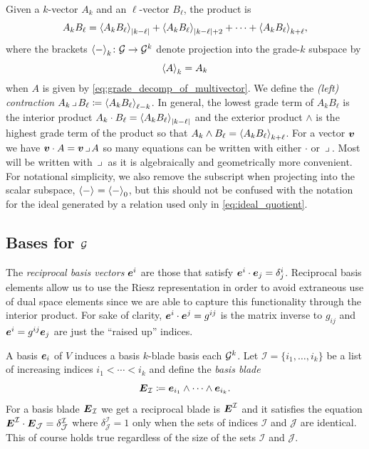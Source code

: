 \documentclass{article}
\begin{document}
Given a $k$-vector $A_k$ and an $\ell$-vector $B_\ell$, the product is
\begin{equation}
\label{eq:general_clifford_multiplication}
A_k B_\ell = \proj{|k-\ell|}{A_k B_\ell} + \proj{|k-\ell|+2}{A_k B_\ell} + \cdots + \proj{k+\ell}{A_k B_\ell},
\end{equation}
where the brackets $\proj{k}{-} \colon \G \to \G^k$ denote projection into the grade-$k$ subspace by
\begin{equation}
\proj{k}{A}=A_k
\end{equation}
when $A$ is given by \cref{eq:grade_decomp_of_multivector}. We define the \emph{(left) contraction} $A_k \contract B_\ell \coloneqq \proj{\ell-k}{A_k B_\ell}$. In general, the lowest grade term of $A_kB_\ell$ is the interior product $A_k \cdot B_\ell = \proj{|k-\ell|}{A_kB_\ell}$ and the exterior product $\wedge$ is the highest grade term of the product so that $A_k \wedge B_\ell = \proj{k+\ell}{A_k B_\ell}$. For a vector $\blade{v}$ we have $\blade{v}\cdot A = \blade{v}\contract A$ so many equations can be written with either $\cdot$ or $\contract$. Most will be written with $\contract$ as it is algebraically and geometrically more convenient. For notational simplicity, we also remove the subscript when projecting into the scalar subspace, $\proj{}{-}=\proj{0}{-}$, but this should not be confused with the notation for the ideal generated by a relation used only in \cref{eq:ideal_quotient}.


\subsection{Bases for $\G$}
The \emph{reciprocal basis vectors $\blade{e}^i$} are those that satisfy $\blade{e}^i \cdot \blade{e}_j = \delta^i_j$. Reciprocal basis elements allow us to use the Riesz representation in order to avoid extraneous use of dual space elements since we are able to capture this functionality through the interior product. For sake of clarity, $\blade{e}^i \cdot \blade{e}^j = g^{ij}$ is the matrix inverse to $g_{ij}$ and $\blade{e}^i = g^{ij} \blade{e}_j$ are just the ``raised up'' indices. 

A basis $\blade{e}_i$ of $V$ induces a basis $k$-blade basis each $\G^k$. Let $\mathcal{I}=\{i_1,\dots,i_k\}$ be a list of increasing indices $i_1 < \cdots < i_k$ and define the \emph{basis blade}
\begin{equation}
\label{eq:basis_blades}
\blade{E}_\mathcal{I} \coloneqq \blade{e}_{i_1}\wedge \cdots \wedge \blade{e}_{i_k}.
\end{equation}
For a basis blade $\blade{E}_\mathcal{I}$ we get a reciprocal blade is $\blade{E}^\mathcal{I}$ and it satisfies the equation $\blade{E}^\mathcal{I} \cdot \blade{E}_\mathcal{J}= \delta^\mathcal{I}_\mathcal{J}$ where $\delta^\mathcal{I}_\mathcal{J}=1$ only when the sets of indices $\mathcal{I}$ and $\mathcal{J}$ are identical. This of course holds true regardless of the size of the sets $\mathcal{I}$ and $\mathcal{J}$.
\end{document}
